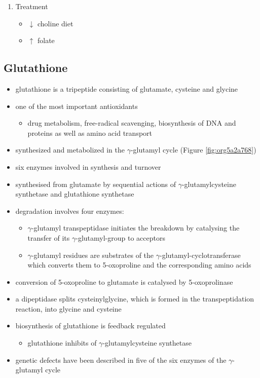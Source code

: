 \documentclass[12pt]{scrartcl}
\begin{document}
\begin{enumerate}
\item Treatment
\label{sec:org91f9209}
\begin{itemize}
\item \(\downarrow\) choline diet
\item \(\uparrow\) folate
\end{itemize}
\end{enumerate}

\subsection{Glutathione}
\label{sec:org5248864}
\begin{itemize}
\item glutathione is a tripeptide consisting of glutamate, cysteine and
glycine
\item one of the most important antioxidants
\begin{itemize}
\item drug metabolism, free-radical scavenging, biosynthesis of DNA and
proteins as well as amino acid transport
\end{itemize}
\item synthesized and metabolized in the \(\gamma\)-glutamyl cycle (Figure
\ref{fig:org5a2a768})
\item six enzymes involved in synthesis and turnover
\item synthesised from glutamate by sequential actions of
\(\gamma\)-glutamylcysteine synthetase and glutathione
synthetase
\item degradation involves four enzymes:
\begin{itemize}
\item \(\gamma\)-glutamyl transpeptidase initiates the breakdown by
catalysing the transfer of its \(\gamma\)-glutamyl-group to
acceptors
\item \(\gamma\)-glutamyl residues are substrates of the
\(\gamma\)-glutamyl-cyclotransferase which converts them to
5-oxoproline and the corresponding amino acids
\end{itemize}
\item conversion of 5-oxoproline to glutamate is catalysed by
5-oxoprolinase
\item a dipeptidase splits cysteinylglycine, which is formed in the
transpeptidation reaction, into glycine and cysteine
\item biosynthesis of glutathione is feedback regulated
\begin{itemize}
\item glutathione inhibits of \(\gamma\)-glutamylcysteine synthetase
\end{itemize}
\item genetic defects have been described in five of the six enzymes of
the \(\gamma\)-glutamyl cycle
\end{itemize}
\end{document}
